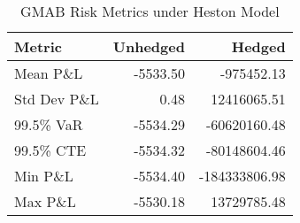 
\begin{table}[h]
\centering
\caption{GMAB Risk Metrics under Heston Model}
\label{tab:gmab_heston_results}
\begin{tabular}{lrr}
\toprule
Metric & Unhedged & Hedged \\
\midrule
Mean P\&L & -5533.50 & -975452.13 \\
Std Dev P\&L & 0.48 & 12416065.51 \\
99.5\% VaR & -5534.29 & -60620160.48 \\
99.5\% CTE & -5534.32 & -80148604.46 \\
Min P\&L & -5534.40 & -184333806.98 \\
Max P\&L & -5530.18 & 13729785.48 \\
\bottomrule
\end{tabular}
\end{table}

